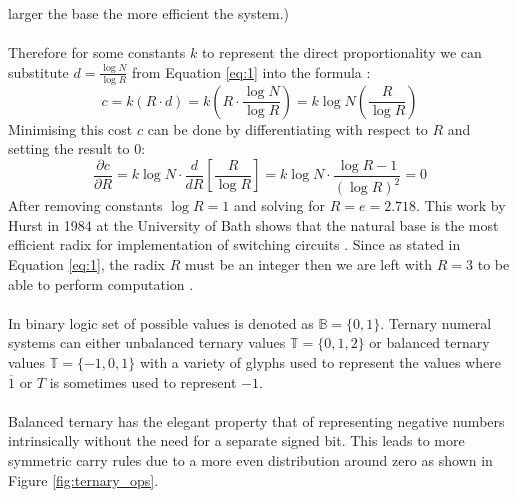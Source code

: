 \documentclass[12pt]{article}
\begin{document}
larger the base the more efficient the system.)\\
\\
Therefore for some constants $k$ to represent the direct proportionality we can substitute $d = \frac{\log N}{\log R}$ from Equation \ref{eq:1} into 
the formula \citep{hurst1984mvl}:
\begin{equation}
  c = k(R \cdot d) = k \left( R \cdot \frac{\log N}{\log R} \right) = k \log N \left(\frac{R}{\log R}\right)
\end{equation}
Minimising this cost $c$ can be done by differentiating with respect to $R$ and setting the result to $0$:
\begin{equation}
  \frac{\partial c}{\partial R} = 
  k\log N\cdot\frac{d}{dR}\left[\frac{R}{\log R}\right] = 
  k\log N\cdot \frac{\log R -1}{(\log R)^2} = 0
\end{equation}
After removing constants $\log R = 1$ and solving for $R = e = 2.718$. This work by Hurst in 1984 at the University 
of Bath shows that the natural base is the most efficient radix for implementation of switching circuits \citep{bitra2018implementation}.
Since as stated in Equation \ref{eq:1}, the radix $R$ must be an 
integer then we are left with $R = 3$ to be able to perform computation \citep{jaber2020mvl}.\\
\\
In binary logic set of possible values is denoted as $\mathbb{B} = \{0, 1\}$. Ternary numeral systems can either unbalanced 
ternary values $\mathbb{T} = \{0, 1, 2\}$ or balanced ternary values $\mathbb{T} = \{-1, 0, 1\}$ with 
a variety of glyphs used to represent the values where $\overline{1}$ or $T$ is sometimes used to represent $-1$.\\
\\
Balanced ternary has the elegant property that of representing negative numbers intrinsically without the need for a 
separate signed bit. This leads to more symmetric carry rules due to a more even distribution around zero as shown in 
Figure \ref{fig:ternary_ops}.\\
\end{document}
